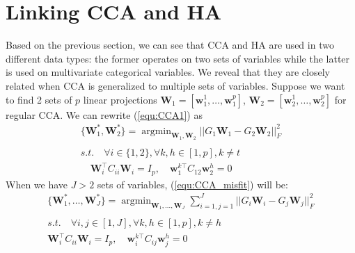 \documentclass[a4paper]{article}
\newcommand{\argmin}{\mathop\mathrm{argmin}}
\begin{document}
\section{Linking CCA and HA}
\label{sec:linking}
Based on the previous section, we can see that CCA and HA are used in two different data types: the former operates on two sets of variables 
while the latter is used on multivariate categorical variables. We reveal that they are closely related when CCA is generalized to multiple sets of variables. 
Suppose we 
want to find 2 sets of $p$ linear projections $\mathbf{W}_1=[\mathbf{w}_1^1,\ldots, \mathbf{w}_1^p]$, $\mathbf{W}_2=[\mathbf{w}_2^1,\ldots, \mathbf{w}_2^p]$ for regular CCA. We can rewrite 
(\ref{equ:CCA1}) as
\begin{equation}
    \begin{array}{l}
        \{\mathbf{W}_1^*,\mathbf{W}_2^*\}  =  \displaystyle\argmin_{\mathbf{W}_1,\mathbf{W}_2} ||G_1 \mathbf{W}_1  -G_2 \mathbf{W}_2 ||_F^2 \\ \\
                        s.t.  \quad  \forall i\in\{1,2\}, \forall k,h\in [1,p], k\neq t \\ 
                        \quad\mathbf{W}_i^\top C_{ii} \mathbf{W}_i=I_p, \quad \mathbf{w}_1^{k \top} C_{12}\mathbf{w}_2^h=0
    \end{array}
    \label{equ:CCA_misfit}
\end{equation}
When we have $J>2$ sets of variables, (\ref{equ:CCA_misfit}) will be: 
\begin{equation}
    \begin{array}{l}
        \{\mathbf{W}_1^*,\ldots,\mathbf{W}_J^*\} = 
        \displaystyle\argmin_{\mathbf{W}_1, \ldots,\mathbf{W}_J} \sum_{i=1,j=1}^J ||G_i \mathbf{W}_i  -G_j \mathbf{W}_j ||_F^2 \\ \\
                        s.t. \quad \forall i,j\in[1,J], \forall k,h\in [1,p], k\neq h  \\
                        \mathbf{W}_i^\top C_{ii} \mathbf{W}_i=I_p, \quad \mathbf{w}_i^{k \top} C_{ij}\mathbf{w}_j^h=0
    \end{array}
    \label{equ:CCA_SE}
\end{equation}
\end{document}
